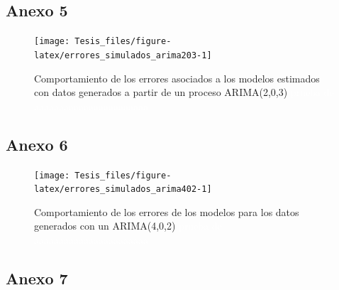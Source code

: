 \documentclass[
]{article}
\begin{document}
\subsection{Anexo 5}

\begin{figure}[H]
\texttt{[image: Tesis\_files/figure-latex/errores\_simulados\_arima203-1]} \caption{Comportamiento de los errores asociados a los modelos estimados con datos generados a partir de un proceso ARIMA(2,0,3) \textcolor{white}{prueba de aaaaaaaaaaaaaaaaaaaaaaa}}\label{fig:errores_simulados_arima203}
\end{figure}

\subsection{Anexo 6}

\begin{figure}[H]
\texttt{[image: Tesis\_files/figure-latex/errores\_simulados\_arima402-1]} \caption{Comportamiento de los errores de los modelos para los datos generados con un ARIMA(4,0,2) \textcolor{white}{prueba de aaaaaaaaaaaaaaaaaaaaaaa}}\label{fig:errores_simulados_arima402}
\end{figure}

\subsection{Anexo 7}
\end{document}
